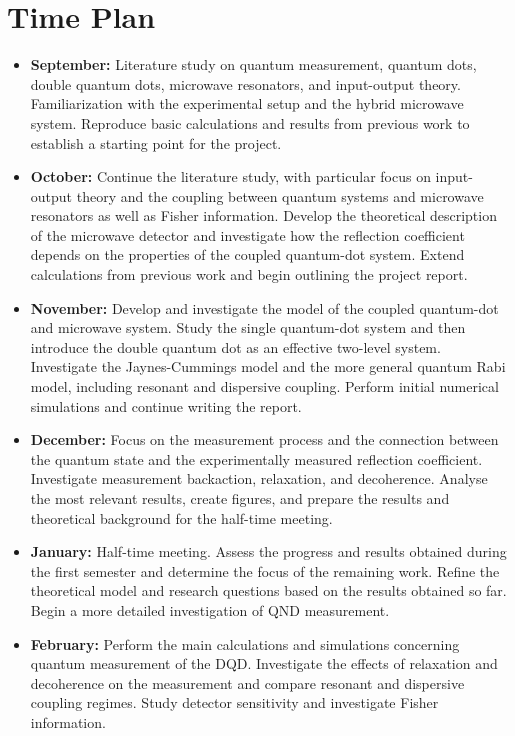 \section{Time Plan}
\begin{itemize}
    \item \textbf{September:} Literature study on quantum measurement, quantum dots, double quantum dots, microwave resonators, and input-output theory. Familiarization with the experimental setup and the hybrid microwave system. Reproduce basic calculations and results from previous work to establish a starting point for the project.

    \item \textbf{October:} Continue the literature study, with particular focus on input-output theory and the coupling between quantum systems and microwave resonators as well as Fisher information. Develop the theoretical description of the microwave detector and investigate how the reflection coefficient depends on the properties of the coupled quantum-dot system. Extend calculations from previous work and begin outlining the project report.

    \item \textbf{November:} Develop and investigate the model of the coupled quantum-dot and microwave system. Study the single quantum-dot system and then introduce the double quantum dot as an effective two-level system. Investigate the Jaynes-Cummings model and the more general quantum Rabi model, including resonant and dispersive coupling. Perform initial numerical simulations and continue writing the report.

    \item \textbf{December:} Focus on the measurement process and the connection between the quantum state and the experimentally measured reflection coefficient. Investigate measurement backaction, relaxation, and decoherence. Analyse the most relevant results, create figures, and prepare the results and theoretical background for the half-time meeting.

    \item \textbf{January:} Half-time meeting. Assess the progress and results obtained during the first semester and determine the focus of the remaining work. Refine the theoretical model and research questions based on the results obtained so far. Begin a more detailed investigation of QND measurement.

    \item \textbf{February:} Perform the main calculations and simulations concerning quantum measurement of the DQD. Investigate the effects of relaxation and decoherence on the measurement and compare resonant and dispersive coupling regimes. Study detector sensitivity and investigate Fisher information.


\end{itemize}
